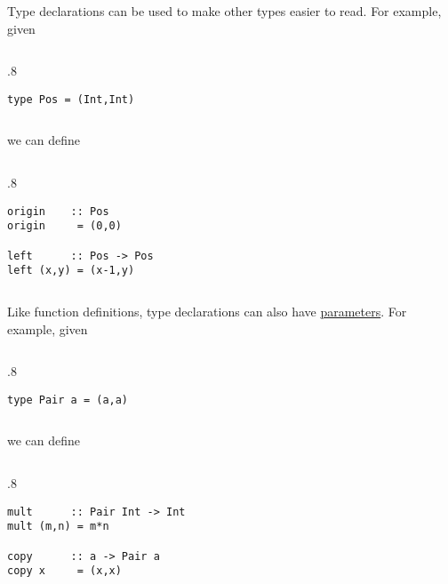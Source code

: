 \documentclass{beamer}
\newenvironment{codeblock}[1][.8]{%
\begin{columns}
\begin{column}{#1\linewidth}
\begin{exampleblock}{}}{%
\end{exampleblock}
\end{column}
\end{columns}}
\def\slideskip{\vskip 0.1in}
\begin{document}
\begin{frame}[fragile]
\Large


Type declarations can be used to make other types 
easier to read.  
For example, given 

\slideskip

\begin{codeblock}
\begin{verbatim}
type Pos = (Int,Int)
\end{verbatim}
\end{codeblock}

\slideskip
we can define
\slideskip
\begin{codeblock}
\begin{verbatim}
origin    :: Pos 
origin     = (0,0) 

left      :: Pos -> Pos 
left (x,y) = (x-1,y) 
\end{verbatim}
\end{codeblock}

\end{frame}

\begin{frame}[fragile]
\Large

Like function definitions, type declarations can also 
have \underline{parameters}. 
For example, given 

\slideskip

\begin{codeblock}
\begin{verbatim}
type Pair a = (a,a) 
\end{verbatim}
\end{codeblock}

\slideskip
we can define
\slideskip

\begin{codeblock}
\begin{verbatim}
mult      :: Pair Int -> Int 
mult (m,n) = m*n

copy      :: a -> Pair a 
copy x     = (x,x)
\end{verbatim}
\end{codeblock}

\end{frame}
\end{document}
